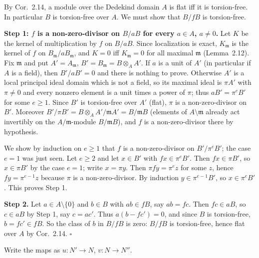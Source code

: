 \documentclass[11pt]{article}
\begin{document}
\pf
By Cor.~2.14, a module over the Dedekind domain $A$ is flat iff it is torsion-free. In particular $B$ is torsion-free over $A$. We must show that $B/fB$ is torsion-free.

\textbf{Step 1: $f$ is a non-zero-divisor on $B/aB$ for every $a\in A$, $a\ne0$.} Let $K$ be the kernel of multiplication by $f$ on $B/aB$. Since localization is exact, $K_{\mathfrak m}$ is the kernel of $f$ on $B_{\mathfrak m}/aB_{\mathfrak m}$, and $K=0$ iff $K_{\mathfrak m}=0$ for all maximal $\mathfrak m$ (Lemma~2.12). Fix $\mathfrak m$ and put $A'=A_{\mathfrak m}$, $B'=B_{\mathfrak m}=B\otimes_AA'$. If $a$ is a unit of $A'$ (in particular if $A$ is a field), then $B'/aB'=0$ and there is nothing to prove. Otherwise $A'$ is a local principal ideal domain which is not a field, so its maximal ideal is $\pi A'$ with $\pi\neq0$ and every nonzero element is a unit times a power of $\pi$; thus $aB'=\pi^eB'$ for some $e\ge1$. Since $B'$ is torsion-free over $A'$ (flat), $\pi$ is a non-zero-divisor on $B'$. Moreover $B'/\pi B'=B\otimes_A A'/\mathfrak mA'=B/\mathfrak mB$ (elements of $A\setminus\mathfrak m$ already act invertibly on the $A/\mathfrak m$-module $B/\mathfrak mB$), and $f$ is a non-zero-divisor there by hypothesis.

We show by induction on $e\ge1$ that $f$ is a non-zero-divisor on $B'/\pi^eB'$; the case $e=1$ was just seen. Let $e\ge2$ and let $x\in B'$ with $fx\in\pi^eB'$. Then $fx\in\pi B'$, so $x\in\pi B'$ by the case $e=1$; write $x=\pi y$. Then $\pi fy=\pi^ez$ for some $z$, hence $fy=\pi^{e-1}z$ because $\pi$ is a non-zero-divisor. By induction $y\in\pi^{e-1}B'$, so $x\in\pi^eB'$. This proves Step 1.

\textbf{Step 2.} Let $a\in A\setminus\{0\}$ and $b\in B$ with $ab\in fB$, say $ab=fc$. Then $fc\in aB$, so $c\in aB$ by Step 1, say $c=ac'$. Thus $a(b-fc')=0$, and since $B$ is torsion-free, $b=fc'\in fB$. So the class of $b$ in $B/fB$ is zero: $B/fB$ is torsion-free, hence flat over $A$ by Cor.~2.14. \hfill$\square$

\pf
Write the maps as $u:N'\to N$, $v:N\to N''$.
\end{document}
